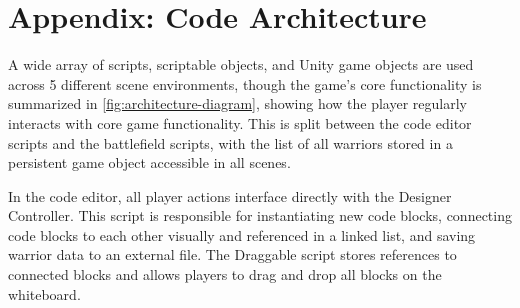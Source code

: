 \documentclass[10pt,twocolumn]{article}
\begin{document}
\section{Appendix: Code Architecture}
A wide array of scripts, scriptable objects, and Unity game objects are used across 5 different scene environments, though the game’s core functionality is summarized in \ref{fig:architecture-diagram}, showing how the player regularly interacts with core game functionality. This is split between the code editor scripts and the battlefield scripts, with the list of all warriors stored in a persistent game object accessible in all scenes.

In the code editor, all player actions interface directly with the Designer Controller. This script is responsible for instantiating new code blocks, connecting code blocks to each other visually and referenced in a linked list, and saving warrior data to an external file. The Draggable script stores references to connected blocks and allows players to drag and drop all blocks on the whiteboard.
\end{document}
